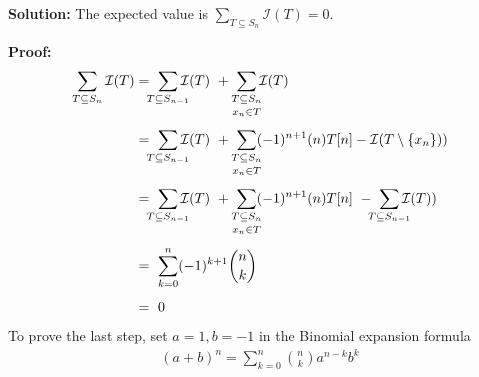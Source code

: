 
\textbf{Solution:}
The expected value is $\sum_{T \subseteq S_{n}} \mathcal{I} (T) = 0$.

\textbf{Proof:}
\begin{align*}
\sum_{T \subseteq S_{n}} \mathcal{I} (T)
& 
= \ \sum_{\mathclap{\substack{T \subseteq S_{n-1}}}} \mathcal{I} (T)
\ +\ \sum_{\mathclap{\substack{T \subseteq S_{n} \\[0.5ex] x_{n} \in T}}} \mathcal{I} (T)
\\[1ex]
&
= \ \sum_{\mathclap{\substack{T \subseteq S_{n-1}}}} \mathcal{I} (T)
\ +\ \sum_{\mathclap{\substack{T \subseteq S_{n} \\[0.5ex] x_{n} \in T}}} (-1)^{n+1}(n)T[n]-\mathcal{I} (T\setminus\{x_{n}\}))
\\[1ex]
&
= \ \sum_{\mathclap{\substack{T \subseteq S_{n-1}}}} \mathcal{I} (T)
\ +\ \sum_{\mathclap{\substack{T \subseteq S_{n} \\[0.5ex] x_{n} \in T}}} (-1)^{n+1}(n)T[n]
\ -\ \sum_{\mathclap{\substack{T \subseteq S_{n-1}}}} \mathcal{I} (T))
\\[1ex]
&
= \ \sum_{k=0}^{n} (-1)^{k+1}\binom{n}{k}
\\[1ex]
&
= \ 0
\end{align*}
To prove the last step, set $a=1,b=-1$ in the Binomial expansion formula
\begin{align*}
(a+b)^{n} = \sum_{k=0}^{n} \binom{n}{k} a^{n-k} b^{k}
\end{align*}
